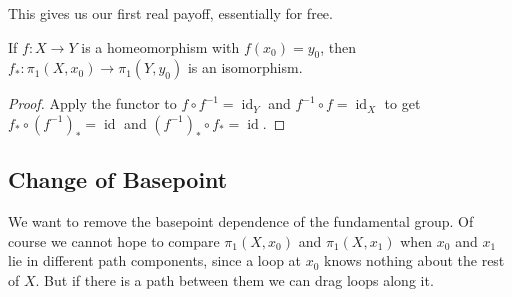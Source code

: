 \documentclass[a4paper]{scrartcl}
\newcommand{\id}{\operatorname{id}}
\begin{document}
This gives us our first real payoff, essentially for free.

\begin{corollary} \label{cor:homeo-iso}
	If $f: X \to Y$ is a homeomorphism with $f(x_0) = y_0$, then $f_*: \pi_1(X,x_0) \to \pi_1(Y,y_0)$ is an isomorphism.
\end{corollary}
\begin{proof}
	Apply the functor to $f \circ f^{-1} = \id_Y$ and $f^{-1} \circ f = \id_X$ to get $f_* \circ (f^{-1})_* = \id$ and $(f^{-1})_* \circ f_* = \id$.
\end{proof}

\subsection{Change of Basepoint}

We want to remove the basepoint dependence of the fundamental group. Of course we cannot
hope to compare $\pi_1(X, x_0)$ and $\pi_1(X, x_1)$ when $x_0$ and $x_1$ lie in different
path components, since a loop at $x_0$ knows nothing about the rest of $X$. But if there
is a path between them we can drag loops along it.
\end{document}
